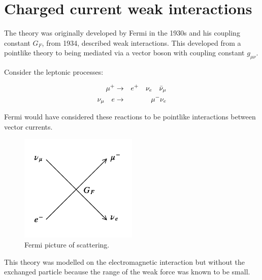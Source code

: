 
\chapter{Charged current weak interactions}

The theory was originally developed by Fermi in the 1930s and his coupling constant $G_F$, from 1934, described weak interactions.  This developed from a pointlike theory to being mediated via a vector boson with coupling constant $g_{\mu\nu}$.

Consider the leptonic processes:

\begin{eqnarray*}
  \mu^+ & \to & e^+ \quad \nu_e \quad \bar{\nu}_{\mu} \\
  \nu_{\mu} \quad e & \to & \mu^- \nu_e
\end{eqnarray*}

Fermi would have considered these reactions to be pointlike interactions between vector currents.

\begin{figure}[!htb]
  \begin{center}
    \includegraphics[width=0.5\textwidth]{images/web_feynman/image_42.png}
    \caption[Fermi picture of scattering]{Fermi picture of scattering.}
    \label{fig:ch12_FermiScattering}
  \end{center}
\end{figure}

This theory was modelled on the electromagnetic interaction but without the exchanged particle because the range of the weak force was known to be small.

